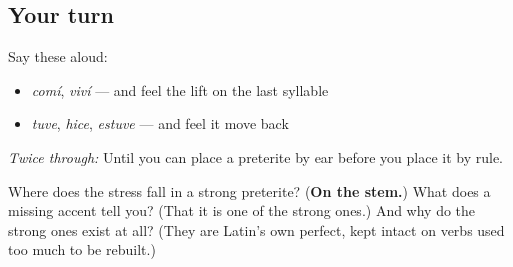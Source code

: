 \subsection*{Your turn}
Say these aloud:

\begin{itemize}
\raggedright
  \item \emph{comí}, \emph{viví} — and feel the lift on the last syllable
  \item \emph{tuve}, \emph{hice}, \emph{estuve} — and feel it move back
\end{itemize}

\emph{Twice through:} Until you can place a preterite by ear before you place it by rule.

\begin{tcolorbox}[breakable,colback=teal!4,colframe=teal!35!black,title={Before you move on}]
Where does the stress fall in a strong preterite? (\textbf{On the stem.}) What does a missing accent tell you? (That it is one of the strong ones.) And why do the strong ones exist at all? (They are Latin's own perfect, kept intact on verbs used too much to be rebuilt.)
\end{tcolorbox}
